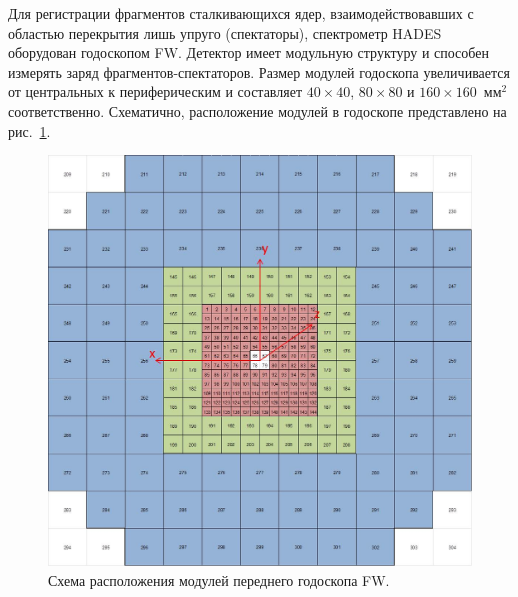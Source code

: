 Для регистрации фрагментов сталкивающихся ядер, взаимодействовавших с областью перекрытия лишь упруго (спектаторы), спектрометр HADES оборудован годоскопом FW.
Детектор имеет модульную структуру и способен измерять заряд фрагментов-спектаторов.
Размер модулей годоскопа увеличивается от центральных к периферическим и составляет $40\times40$, $80\times80$ и $160\times160$~мм$^2$ соответственно.
Схематично, расположение модулей в годоскопе представлено на рис.~\ref{fig:hodo_layout}.
%
\begin{figure}[ht]
\begin{center}
\includegraphics[width=0.55\linewidth]{images/FW_layout.jpg}
\caption{Схема расположения модулей переднего годоскопа FW.}
\label{fig:hodo_layout}
\end{center}
\end{figure}
